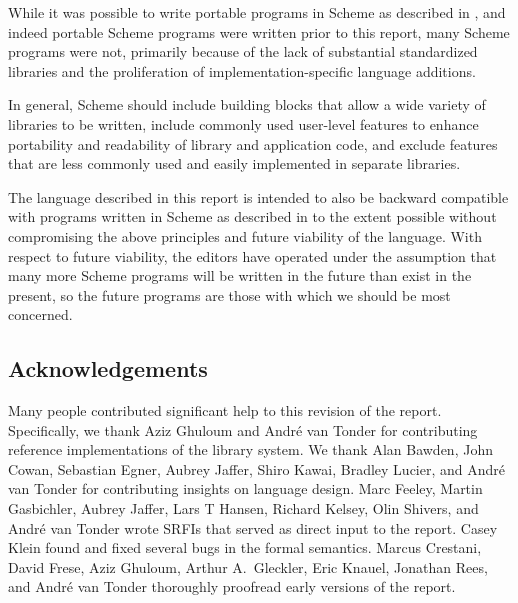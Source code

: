 While it was possible to write portable programs in Scheme as
described in , and indeed portable Scheme programs were written
prior to this report, many Scheme programs were not, primarily because
of the lack of substantial standardized libraries and the
proliferation of implementation-specific language additions.

In general, Scheme should include building blocks that allow a wide
variety of libraries to be written, include commonly used user-level
features to enhance portability and readability of library and
application code, and exclude features that are less commonly used and
easily implemented in separate libraries.

The language described in this report is intended to also be backward
compatible with programs written in Scheme as described in  to
the extent possible without compromising the above principles and
future viability of the language.  With respect to future viability,
the editors have operated under the assumption that many more Scheme
programs will be written in the future than exist in the present, so
the future programs are those with which we should be most concerned.

\subsection*{Acknowledgements}

Many people contributed significant help to this revision of the
report.  Specifically, we thank Aziz Ghuloum and Andr\'e van Tonder for
contributing reference implementations of the library system.  We
thank Alan Bawden, John Cowan, Sebastian Egner, Aubrey Jaffer, Shiro
Kawai, Bradley Lucier, and Andr\'e van Tonder for contributing insights on
language design.  Marc Feeley, Martin Gasbichler, Aubrey Jaffer, Lars T Hansen,
Richard Kelsey, Olin Shivers, and Andr\'e van Tonder wrote SRFIs that
served as direct input to the report.  
Casey Klein found and fixed several bugs in the formal semantics.
Marcus Crestani, David Frese, 
Aziz Ghuloum, Arthur A.\ Gleckler, Eric Knauel, Jonathan Rees, and Andr\'e
van Tonder thoroughly proofread early versions of the report.

